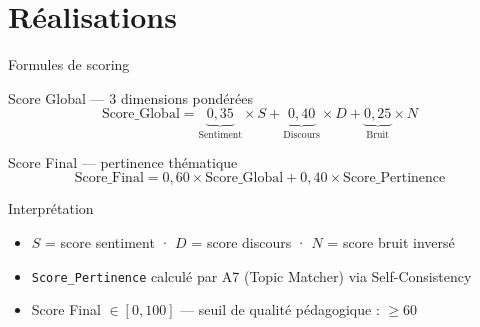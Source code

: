 \documentclass[aspectratio=169, 12pt]{beamer}
\begin{document}

\section{Réalisations}

\begin{frame}{Formules de scoring}

  \begin{block}{Score Global — 3 dimensions pondérées}
    \begin{equation*}
      \text{Score\_Global} = \underbrace{0{,}35}_{\text{Sentiment}} \times S
                           + \underbrace{0{,}40}_{\text{Discours}} \times D
                           + \underbrace{0{,}25}_{\text{Bruit}} \times N
    \end{equation*}
  \end{block}

  \vspace{0.3cm}

  \begin{block}{Score Final — pertinence thématique}
    \begin{equation*}
      \text{Score\_Final} = 0{,}60 \times \text{Score\_Global}
                          + 0{,}40 \times \text{Score\_Pertinence}
    \end{equation*}
  \end{block}

  \vspace{0.3cm}
  \begin{alertblock}{Interprétation}
    \small
    \begin{itemize}
      \item $S$ = score sentiment · $D$ = score discours · $N$ = score bruit inversé
      \item \texttt{Score\_Pertinence} calculé par A7 (Topic Matcher) via Self-Consistency
      \item Score Final $\in [0, 100]$ — seuil de qualité pédagogique : $\geq 60$
    \end{itemize}
  \end{alertblock}

\end{frame}
\end{document}
